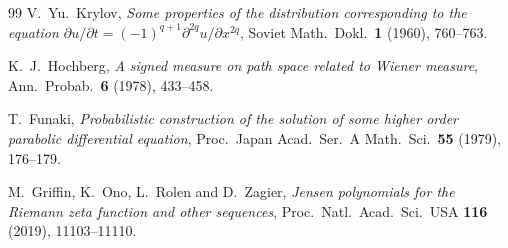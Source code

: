 \documentclass[11pt,reqno]{amsart}
\theoremstyle{plain}
\theoremstyle{definition}
\theoremstyle{remark}
\begin{document}
\begin{thebibliography}{99}
 V.~Yu.~Krylov, \emph{Some properties of the distribution
corresponding to the equation $\partial u/\partial t=(-1)^{q+1}
\partial^{2q}u/\partial x^{2q}$}, Soviet Math.\ Dokl.\ \textbf{1} (1960),
760--763.

 K.~J.~Hochberg, \emph{A signed measure on path space
related to Wiener measure}, Ann.\ Probab.\ \textbf{6} (1978), 433--458.

 T.~Funaki, \emph{Probabilistic construction of the solution
of some higher order parabolic differential equation}, Proc.\ Japan Acad.\
Ser.\ A Math.\ Sci.\ \textbf{55} (1979), 176--179.

 M.~Griffin, K.~Ono, L.~Rolen and D.~Zagier, \emph{Jensen
polynomials for the Riemann zeta function and other sequences}, Proc.\
Natl.\ Acad.\ Sci.\ USA \textbf{116} (2019), 11103--11110.

\end{thebibliography}
\end{document}
